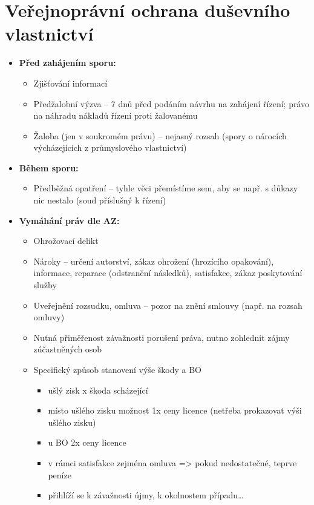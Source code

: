 \section{Veřejnoprávní ochrana duševního vlastnictví}

\begin{itemize}
    \item\textbf{Před zahájením sporu:} 
    \begin{itemize}
        \item Zjišťování informací
        \item Předžalobní výzva – 7 dnů před podáním návrhu na zahájení řízení; právo na náhradu nákladů řízení proti
        žalovanému
        \item Žaloba (jen v soukromém právu) – nejasný rozsah (spory o nárocích výcházejících z průmyslového vlastnictví)
    \end{itemize}
    \item\textbf{Během sporu:}
    \begin{itemize}
        \item Předběžná opatření – tyhle věci přemístíme sem, aby se např. s důkazy nic nestalo (soud příslušný k řízení)
    \end{itemize}
    \item\textbf{Vymáhání práv dle AZ:}
    \begin{itemize}
        \item Ohrožovací delikt
        \item Nároky – určení autorství, zákaz ohrožení (hrozícího opakování), informace, reparace (odstranění následků),
        satisfakce, zákaz poskytování služby
        \item Uveřejnění rozsudku, omluva – pozor na znění smlouvy (např. na rozsah omluvy)
        \item Nutná přiměřenost závažnosti porušení práva, nutno zohlednit zájmy zúčastněných osob
        \item Specifický způsob stanovení výše škody a BO
        \begin{itemize}
            \item ušlý zisk x škoda scházející
            \item místo ušlého zisku možnost 1x ceny licence (netřeba prokazovat výši ušlého zisku)
            \item u BO 2x ceny licence
            \item v rámci satisfakce zejména omluva => pokud nedostatečné, teprve peníze
            \item přihlíží se k závažnosti újmy, k okolnostem případu…

\end{itemize}
\end{itemize}
\end{itemize}
